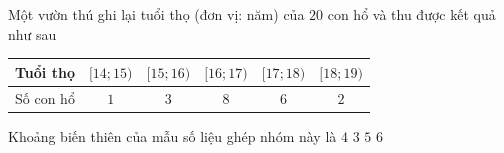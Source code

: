 \begin{ex}%
	Một vườn thú ghi lại tuổi thọ (đơn vị: năm) của $20$ con hổ và thu được  kết quả như sau
	\begin{center}
		\begin{tabular}{|c|c|c|c|c|c|}
			 \hline
			Tuổi thọ & $[14; 15)$ & $[15; 16)$ & $[16; 17)$ & $[17; 18)$ & $[18; 19)$ \\ \hline 
			Số con hổ & $1$ & $3$ & $8$ & $6$  & $2$ \\ \hline
		\end{tabular}
	\end{center}
	Khoảng biến thiên của mẫu số liệu ghép nhóm này là 
	 \choice
		{$4$} 
		 {$3$}
		{\True $5$} 
		{$6$} 
\end{ex}



